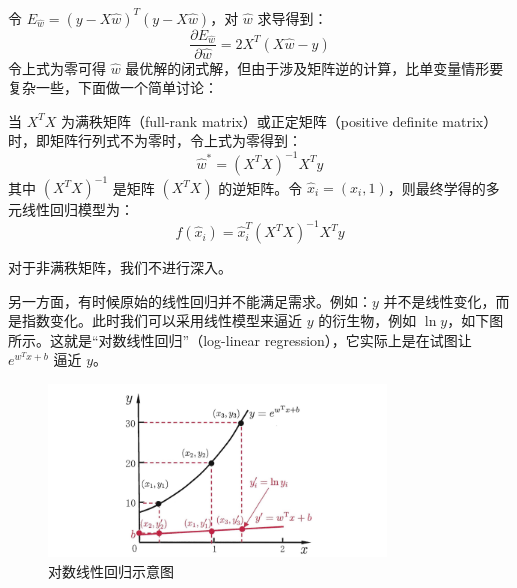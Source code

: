 \documentclass[12pt, a4paper]{article} %
\begin{document}
令 $E_{\hat{w}} = {\left( {y - X\hat w} \right)^T}\left( {y - X\hat w} \right)$，对 $\hat{w}$ 求导得到：
\begin{equation*}
    \frac{{\partial {E_{\hat w}}}}{{\partial \hat w}} = 2{X^T}(X\hat w - y)
\end{equation*}
令上式为零可得 $\hat{w}$ 最优解的闭式解，但由于涉及矩阵逆的计算，比单变量情形要复杂一些，下面做一个简单讨论：

当 $X^TX$ 为满秩矩阵（full-rank matrix）或正定矩阵（positive definite matrix）时，即矩阵行列式不为零时，令上式为零得到：
\begin{equation*}
    \hat{w}^* = (X^TX)^{-1} X^T y
\end{equation*}
其中 $(X^TX)^{-1}$ 是矩阵 $(X^TX)$ 的逆矩阵。令 $\hat{x}_i = (x_i, 1)$，则最终学得的多元线性回归模型为：
\begin{equation*}
    f(\hat{x}_i) = \hat{x}_i^T (X^TX)^{-1} X^Ty
\end{equation*}

对于非满秩矩阵，我们不进行深入。

另一方面，有时候原始的线性回归并不能满足需求。例如：$y$ 并不是线性变化，而是指数变化。此时我们可以采用线性模型来逼近 $y$ 的衍生物，例如 $\ln y$，如下图所示。这就是“对数线性回归”（log-linear regression），它实际上是在试图让 $e^{w^Tx +b}$ 逼近 $y$。

\begin{figure}[H]
    \centering
    \includegraphics[width=0.8\textwidth]{../img/3-1-对数线性回归示意图.png}
    \caption{对数线性回归示意图}
    \label{fig:对数线性回归示意图}
\end{figure}
\end{document}

